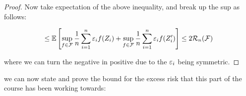 \documentclass[11pt]{scrartcl}
\begin{document}
\begin{theorem}
\begin{proof}
    
    Now take expectation of the above inequality, and break up the sup as follows:
    
    \begin{align}
        \le \mathbb{E} \left[  \sup_{f \in \mathcal{F}} \frac1n \sum_{i=1}^n \varepsilon_i f(Z_i) + \sup_{f \in \mathcal{F}} \frac1n \sum_{i=1}^n \varepsilon_i f(Z_i') \right] \le 2\mathcal{R}_n(\mathcal{F})
    \end{align}
    
    where we can turn the negative in positive due to the $\varepsilon_i$ being symmetric.
    \end{proof}
\end{theorem}


we can now state and prove the bound for the excess risk that this part of the course has been working towards:
\end{document}
